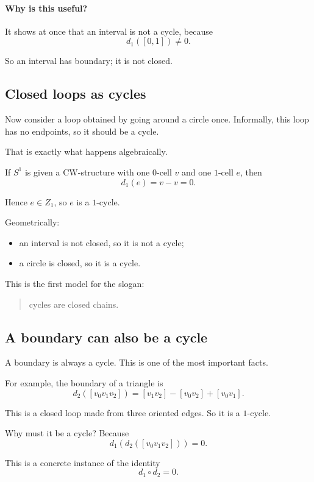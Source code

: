 \documentclass[12pt,a4paper]{article}
\theoremstyle{notespace}
\begin{document}
\paragraph{Why is this useful?}
It shows at once that an interval is not a cycle, because
\[
d_1([0,1])\neq 0.
\]

So an interval has boundary; it is not closed.

\subsection{ Closed loops as cycles}

Now consider a loop obtained by going around a circle once. Informally, this loop has no endpoints, so it should be a cycle.

That is exactly what happens algebraically.

If \(S^1\) is given a CW-structure with one \(0\)-cell \(v\) and one \(1\)-cell \(e\), then
\[
d_1(e)=v-v=0.
\]

Hence \(e\in Z_1\), so \(e\) is a \(1\)-cycle.

Geometrically:

\begin{itemize}
	\item an interval is not closed, so it is not a cycle;
	\item a circle is closed, so it is a cycle.
\end{itemize}

This is the first model for the slogan:

\begin{quote}
	cycles are closed chains.
\end{quote}

\subsection{ A boundary can also be a cycle}

A boundary is always a cycle. This is one of the most important facts.

For example, the boundary of a triangle is
\[
d_2([v_0v_1v_2])
=
[v_1v_2]-[v_0v_2]+[v_0v_1].
\]

This is a closed loop made from three oriented edges. So it is a \(1\)-cycle.

Why must it be a cycle? Because
\[
d_1(d_2([v_0v_1v_2]))=0.
\]

This is a concrete instance of the identity
\[
d_1\circ d_2=0.
\]
\end{document}

